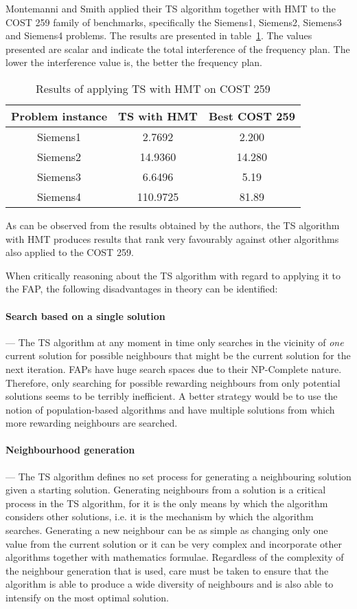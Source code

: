 Montemanni and Smith applied their \gls{TS} algorithm together with HMT to the \gls{COST} 259 family of benchmarks, specifically the Siemens1, Siemens2, Siemens3 and Siemens4 problems. The results are presented in table~\ref{TSCOST259}. The values presented are scalar and indicate the total interference of the frequency plan. The lower the interference value is, the better the frequency plan.
\begin{table}[H]
\centering
	\begin{tabular}{| c | c | c |}
		\hline
		Problem instance & \gls{TS} with \gls{HMT} & Best \gls{COST} 259 \\ \hline
		Siemens1 & 2.7692 & 2.200 \\ \hline
		Siemens2 & 14.9360 & 14.280 \\ \hline
		Siemens3 & 6.6496 & 5.19 \\ \hline
		Siemens4 & 110.9725 & 81.89 \\ \hline
	\end{tabular}
\caption{Results of applying \gls{TS} with \gls{HMT} on \gls{COST} 259}
\label{TSCOST259}
\end{table}
As can be observed from the results obtained by the authors, the \gls{TS} algorithm with HMT produces results that rank very favourably against other algorithms also applied to the \gls{COST} 259.

When critically reasoning about the \gls{TS} algorithm with regard to applying it to the \gls{FAP}, the following disadvantages in theory can be identified:
\paragraph{Search based on a single solution}
--- The \gls{TS} algorithm at any moment in time only searches in the vicinity of \emph{one} current solution for possible neighbours that might be the current solution for the next iteration. \gls{FAP}s have huge search spaces due to their NP-Complete nature. Therefore, only searching for possible rewarding neighbours from only potential solutions seems to be terribly inefficient. A better strategy would be to use the notion of population-based algorithms and have multiple solutions from which more rewarding neighbours are searched.
\paragraph{Neighbourhood generation}
--- The \gls{TS} algorithm defines no set process for generating a neighbouring solution given a starting solution. Generating neighbours from a solution is a critical process in the \gls{TS} algorithm, for it is the only means by which the algorithm considers other solutions, i.e. it is the mechanism by which the algorithm searches. Generating a new neighbour can be as simple as changing only one value from the current solution or it can be very complex and incorporate other algorithms together with mathematics formulae. Regardless of the complexity of the neighbour generation that is used, care must be taken to ensure that the algorithm is able to produce a wide diversity of neighbours and is also able to intensify on the most optimal solution.
